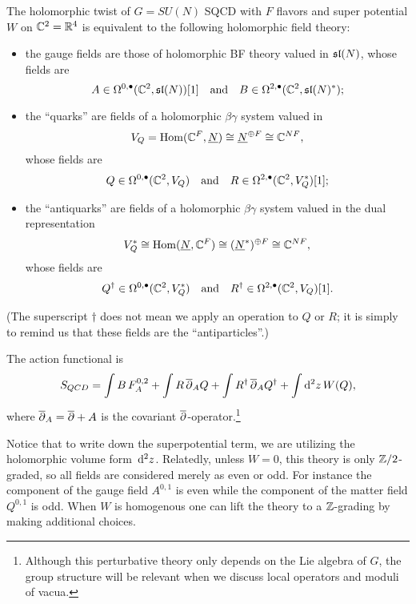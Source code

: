 \documentclass[11pt]{amsart}
\begin{document}
\begin{thm}
The holomorphic twist of $G = SU(N)$ SQCD with $F$ flavors and super potential $W$ on $\C^2 = \RR^4$ is equivalent to the following holomorphic field theory:
\begin{itemize}
\item the gauge fields are those of holomorphic BF theory valued in $\sl(N)$, whose fields are
\[
A \in \Omega^{0,\bu}(\CC^2 , \sl(N))[1] \quad\text{and}\quad B \in \Omega^{2,\bu}(\CC^2, \sl(N)^*);
\]
\item the ``quarks'' are fields of a holomorphic $\beta\gamma$ system valued in 
\[
V_Q = \Hom(\CC^F, \underline{N}) \cong \underline{N}^{\oplus F} \cong \CC^{NF},
\] 
whose fields are
\[
Q \in \Omega^{0,\bu}(\CC^2 , V_Q) \quad\text{and}\quad R \in \Omega^{2,\bu}(\CC^2 , V_Q^*)[1];
\]
\item the ``antiquarks'' are fields of a holomorphic $\beta\gamma$ system valued in the dual representation 
\[
V^*_Q \cong \Hom(\underline{N}, \CC^F) \cong (\underline{N}^*)^{\oplus F} \cong \CC^{NF}, 
\]
whose fields are
\[
Q^\dag \in \Omega^{0,\bu}(\CC^2 , V^*_Q) \quad\text{and}\quad R^\dag \in \Omega^{2,\bu}(\CC^2 , V_Q) [1].
\]
\end{itemize}
(The superscript $\dag$ does not mean we apply an operation to $Q$ or $R$; 
it is simply to remind us that these fields are the ``antiparticles''.)

The action functional is
\[
S_{QCD} = \int B\, F^{0,2}_A + \int R \,\dbar_A Q + \int R^\dag \,\dbar_A Q^\dag + \int\d^2 z \, W(Q) ,
\]
where $\dbar_A = \dbar + A$ is the covariant $\dbar$-operator.\footnote{Although this perturbative theory only depends on the Lie algebra of $G$, the group structure will be relevant when we discuss local operators and moduli of vacua.}
\end{thm}



\begin{rmk}
Notice that to write down the superpotential term, we are utilizing the holomorphic volume form~$\d^2 z$. 
Relatedly, unless $W = 0$, this theory is only $\ZZ/2$-graded, so all fields are considered merely as even or odd.
For instance the component of the gauge field $A^{0,1}$ is even while the component of the matter field $Q^{0,1}$ is odd. 
When $W$ is homogenous one can lift the theory to a $\ZZ$-grading by making additional choices.
\end{rmk}
\end{document}
